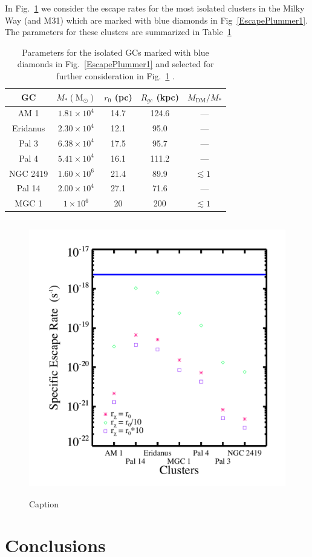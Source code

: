 \documentclass[aps,floatfix,prd,showpacs]{revtex4}
\newcommand{\MDM}{M_{\mathrm{DM}}}
\begin{document}
In Fig.~\ref{var_rad_iso} we consider the escape rates for the most isolated clusters in the Milky Way (and M31) which are marked with blue diamonds in Fig~\ref{EscapePlummer1}.  The parameters for these clusters are summarized in Table~\ref{table_iso}
%
\begin{table}
\begin{tabular}{ | c | c | c | c | c |}
	\hline
	GC & $M_* (\mathrm{M}_\odot)$ & $r_0$ (pc) & $R_{gc}$ (kpc) & $\MDM/M_*$\\
	\hline
  	AM 1 & $1.81\times10^4$ & 14.7 & 124.6 & ---\\
  	Eridanus & $2.30\times10^4$ & 12.1 & 95.0 & ---\\
	Pal 3 & $6.38\times10^4$ & 17.5 & 95.7 &---\\
	Pal 4 & $5.41\times10^4$ & 16.1 & 111.2 & ---\\
	NGC 2419 & $1.60\times10^6$ & 21.4& 89.9 &$\lesssim 1$\ \cite{Conroy} \\
	Pal 14 & $2.00\times10^4$ & 27.1 & 71.6 & --- \\
	MGC 1 & $1\times10^6$ & 20 & 200 & $\lesssim 1$\ \cite{Conroy}  \\
	\hline
\end{tabular}
\caption{Parameters for the isolated GCs marked with blue diamonds in Fig.~\ref{EscapePlummer1} and selected for further consideration in Fig.~\ref{var_rad_iso} \cite{Harris}.}
\label{table_iso}
\end{table}
%
\begin{figure}[htp]
\centering
\includegraphics[width=12cm, height=12cm]{var_rad_iso}
\caption{Caption}  
\label{var_rad_iso}
\end{figure}
%
%

\section{Conclusions}
\label{section:conclusions}


\acknowledgments


\end{document}

